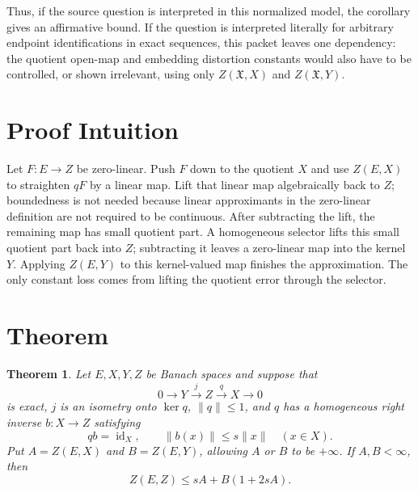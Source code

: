 \documentclass[11pt]{article}
\newtheorem{theorem}{Theorem}
\newcommand{\id}{\operatorname{id}}
\begin{document}
Thus, if the source question is interpreted in this normalized model, the
corollary gives an affirmative bound. If the question is interpreted literally
for arbitrary endpoint identifications in exact sequences, this packet leaves
one dependency: the quotient open-map and embedding distortion constants would
also have to be controlled, or shown irrelevant, using only
$Z(\mathfrak X,X)$ and $Z(\mathfrak X,Y)$.

\section*{Proof Intuition}

Let $F:E\to Z$ be zero-linear. Push $F$ down to the quotient $X$ and use
$Z(E,X)$ to straighten $qF$ by a linear map.  Lift that linear map
algebraically back to $Z$; boundedness is not needed because linear
approximants in the zero-linear definition are not required to be continuous.
After subtracting the lift, the remaining map has small quotient part.  A
homogeneous selector lifts this small quotient part back into $Z$; subtracting
it leaves a zero-linear map into the kernel $Y$.  Applying $Z(E,Y)$ to this
kernel-valued map finishes the approximation.  The only constant loss comes
from lifting the quotient error through the selector.

\section*{Theorem}

\begin{theorem}
Let $E,X,Y,Z$ be Banach spaces and suppose that
\[
0\longrightarrow Y \xrightarrow{j} Z \xrightarrow{q} X\longrightarrow 0
\]
is exact, $j$ is an isometry onto $\ker q$, $\|q\|\leq 1$, and $q$ has a
homogeneous right inverse $b:X\to Z$ satisfying
\[
q b=\id_X,\qquad \|b(x)\|\leq s\|x\|\quad (x\in X).
\]
Put $A=Z(E,X)$ and $B=Z(E,Y)$, allowing $A$ or $B$ to be $+\infty$.  If
$A,B<\infty$, then
\[
Z(E,Z)\leq sA+B(1+2sA).
\]
\end{theorem}
\end{document}
